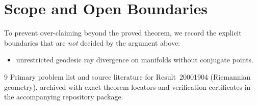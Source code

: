 \documentclass[10pt,reqno]{amsart}
\theoremstyle{definition}
\begin{document}
\section{Scope and Open Boundaries}

To prevent over-claiming beyond the proved theorem, we record the explicit boundaries that are \emph{not} decided by the argument above:
\begin{itemize}
  \item unrestricted geodesic ray divergence on manifolds without conjugate points.
\end{itemize}

\begin{thebibliography}{9}
Primary problem list and source literature for Result~20001904 (Riemannian geometry), archived with exact theorem locators and verification certificates in the accompanying repository package.
\end{thebibliography}
\end{document}
